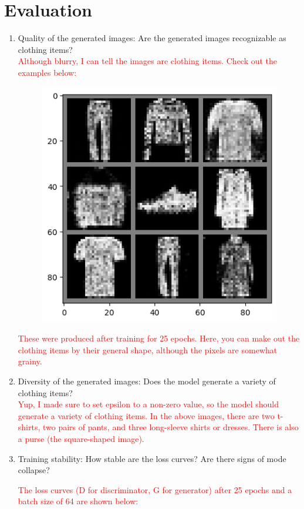 \documentclass{genai}
\begin{document}
\section{Evaluation}

\begin{enumerate}

	\item Quality of the generated images: Are the generated images recognizable as clothing items?\\
	\textcolor{red}{Although blurry, I can tell the images are clothing items. Check out the examples below: }

	\begin{figure}[h]
		\includegraphics[width=.5\textwidth]{example_images.png}	
	\end{figure}

	\textcolor{red}{These were produced after training for 25 epochs. Here, you can make out the clothing items by their general shape, although the pixels are somewhat grainy.}

	\item Diversity of the generated images: Does the model generate a variety of clothing items?\\
	\textcolor{red}{ Yup, I made sure to set epsilon to a non-zero value, so the model should generate a variety of clothing items.
		In the above images, there are two t-shirts, two pairs of pants, and three long-sleeve shirts or dresses.
		There is also a purse (the square-shaped image).
	}

	\item Training stability: How stable are the loss curves? Are there signs of mode collapse?
 
	\textcolor{red}{The loss curves (D for discriminator, G for generator) after 25 epochs and a batch size of 64 are shown below:}
 
        \newpage


\end{enumerate}
\end{document}
